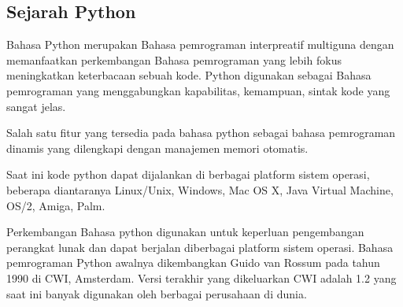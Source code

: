 \subsection{Sejarah Python}
Bahasa Python merupakan Bahasa pemrograman interpreatif multiguna dengan memanfaatkan perkembangan Bahasa pemrograman yang lebih fokus meningkatkan keterbacaan sebuah kode. Python digunakan sebagai Bahasa pemrograman yang menggabungkan kapabilitas, kemampuan, sintak kode yang sangat jelas.

Salah satu fitur yang tersedia pada bahasa python sebagai bahasa pemrograman dinamis yang dilengkapi dengan manajemen memori otomatis. 

Saat ini kode python dapat dijalankan di berbagai platform sistem operasi, beberapa diantaranya Linux/Unix, Windows, Mac OS X, Java Virtual Machine, OS/2, Amiga, Palm.

Perkembangan Bahasa python digunakan untuk keperluan pengembangan perangkat lunak dan dapat berjalan diberbagai platform sistem operasi.
Bahasa pemrograman Python awalnya dikembangkan Guido van Rossum pada tahun 1990 di CWI, Amsterdam. Versi terakhir yang dikeluarkan CWI adalah 1.2 yang saat ini banyak digunakan oleh berbagai perusahaan di dunia.

